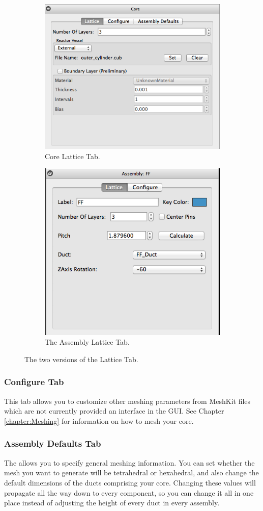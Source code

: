 \begin{figure}
\centering
\begin{subfigure}{.5\textwidth}
  \centering
  \includegraphics[width=0.6\linewidth]{Images/core-lattice.png}
  \caption{Core Lattice Tab.}
  \label{fig:rectSetMaterial}
\end{subfigure}%
\begin{subfigure}{.5\textwidth}
  \centering
  \includegraphics[width=0.55\linewidth]{Images/assy-lattice.png}
  \caption{The Assembly Lattice Tab.}
  \label{fig:rectDuctResult}
\end{subfigure}
\caption{The two versions of the Lattice Tab.}
\label{fig:latticetab}
\end{figure}


\subsubsection{Configure Tab}
This tab allows you to customize other meshing parameters from MeshKit files which are not currently provided an interface in the GUI. See Chapter \ref{chapter:Meshing} for information on how to mesh your core.

\subsubsection{Assembly Defaults Tab}
The  allows you to specify general meshing information.  You can set whether the mesh you want to generate will be tetrahedral or hexahedral, and also change the default dimensions of the ducts comprising your core.  Changing these values will propagate all the way down to every component, so you can change it all in one place instead of adjusting the height of every duct in every assembly.

